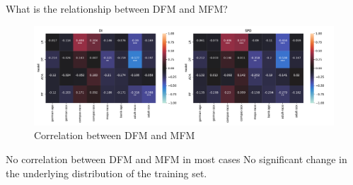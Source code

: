 \documentclass[aspectratio=169]{beamer}
\begin{document}
\begin{frame}{What is the relationship between DFM and MFM?}
  \begin{figure}
    \centering
    \includegraphics[width=0.95\linewidth]{heatmap--corr--full-data.pdf}
    \caption{Correlation between DFM and MFM}
    \label{fig:heatmap--corr--full-data}
  \end{figure}

  \begin{alertblock}{No correlation between DFM and MFM in most cases}
    No significant change in the underlying distribution of the
    training set.
  \end{alertblock}
\end{frame}
\end{document}
